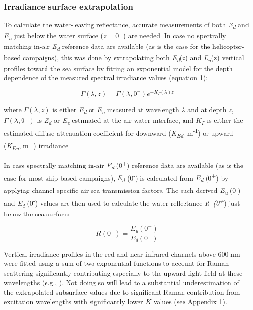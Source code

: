\documentclass[essd, manuscript]{copernicus}
\begin{document}
\subsubsection{Irradiance surface extrapolation}

To calculate the water-leaving reflectance, accurate measurements of both \textit{E\textsubscript{d}} and \textit{E\textsubscript{u}} just below the water surface ($z=0^-$) are needed. In case no spectrally matching in-air \textit{E\textsubscript{d}} reference data are available (as is the case for the helicopter-based campaigns), this was done by extrapolating both \textit{E\textsubscript{d}}(z) and \textit{E\textsubscript{u}}(z) vertical profiles toward the sea surface by fitting an exponential model for the depth dependence of the measured spectral irradiance values (equation 1):

\begin{equation}
    \Gamma(\lambda, z) = \Gamma(\lambda, 0^-)e^{-K_\Gamma(\lambda)z}
\end{equation}

where $\Gamma(\lambda, z)$ is either \textit{E\textsubscript{d}} or \textit{E\textsubscript{u}} measured at wavelength $\lambda$ and at depth $z$, $\Gamma(\lambda, 0^-)$ is \textit{E\textsubscript{d}} or \textit{E\textsubscript{u}} estimated at the air-water interface, and $K_\Gamma$ is either the estimated diffuse attenuation coefficient for downward (\textit{K\textsubscript{Ed}}, m\textsuperscript{-1}) or upward (\textit{K\textsubscript{Eu}}, m\textsuperscript{-1}) irradiance. 

In case spectrally matching in-air \textit{E\textsubscript{d}} (0\textsuperscript{+}) reference data are available (as is the case for most ship-based campaigns), \textit{E\textsubscript{d}} (0\textsuperscript{-}) is calculated from \textit{E\textsubscript{d}} (0\textsuperscript{+}) by applying channel-specific air-sea transmission factors. The such derived \textit{E\textsubscript{u}} (0\textsuperscript{-}) and \textit{E\textsubscript{d}} (0\textsuperscript{-}) values are then used to calculate the water reflectance \textit{R~(0\textsuperscript{+}}) just below the sea surface:

\begin{equation}
    R(0^-) = \frac{E_u(0^-)}{E_d(0^-)}
\end{equation}

Vertical irradiance profiles in the red and near-infrared channels above 600 nm were fitted using a sum of two exponential functions to account for Raman scattering significantly contributing especially to the upward light field at these wavelengths (e.g., \citealt{Sugihara1984}). Not doing so will lead to a substantial underestimation of the extrapolated subsurface values due to significant Raman contribution from excitation wavelengths with significantly lower $K$ values (see Appendix 1).
\end{document}
